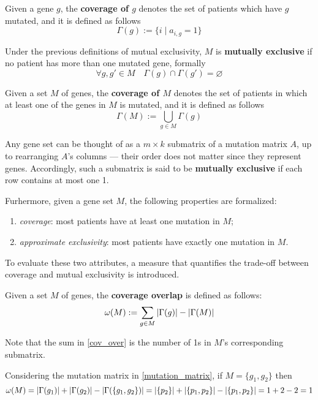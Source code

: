 \begin{definition}
    Given a gene $g$, the \textbf{coverage of $g$} denotes the set of patients which have $g$ mutated, and it is defined as follows $$\Gamma(g) := \{i \mid a_{i, g} = 1\}$$ 
\end{definition}

Under the previous definitions of mutual exclusivity, $M$ is \textbf{mutually exclusive} if no patient has more than one mutated gene, formally $$\forall g, g' \in M \quad \Gamma(g) \cap \Gamma(g') = \varnothing$$

\begin{definition}
    Given a set $M$ of genes, the \textbf{coverage of $M$} denotes the set of patients in which at least one of the genes in $M$ is mutated, and it is defined as follows $$\Gamma(M) := \bigcup_{g \in M}{\Gamma(g)}$$
\end{definition}

Any gene set can be thought of as a $m \times k$ submatrix of a mutation matrix $A$, up to rearranging $A$'s columns --- their order does not matter since they represent genes. Accordingly, such a submatrix is said to be \textbf{mutually exclusive} if each row contains at most one 1.

Furhermore, given a gene set $M$, the following properties are formalized:

\begin{enumerate}[label=\roman*), font=\itshape]
    \item \textit{coverage}: most patients have at least one mutation in $M$;
    \item \textit{approximate exclusivity}: most patients have exactly one mutation in $M$.
\end{enumerate}

To evaluate these two attributes, a measure that quantifies the trade-off between coverage and mutual exclusivity is introduced.

\begin{definition} \label{cov_over}
    Given a set $M$ of genes, the \textbf{coverage overlap} is defined as follows: $$\omega(M) := \sum_{g \in M}{\left|\Gamma(g)\right|} - \left|\Gamma(M)\right|$$
\end{definition}

Note that the sum in \cref{cov_over} is the number of 1s in $M$'s corresponding submatrix.

\begin{example}
    Considering the mutation matrix in \cref{mutation_matrix}, if $M=\{g_1, g_2\}$ then $$\omega(M)=\left|\Gamma(g_1)\right| + \left|\Gamma(g_2)\right| - \left|\Gamma(\{g_1, g_2\})\right| = \left|\{p_2\}\right| + \left|\{p_1, p_2\}\right| - \left|\{p_1, p_2\}\right| = 1 + 2 - 2 = 1$$
\end{example}

